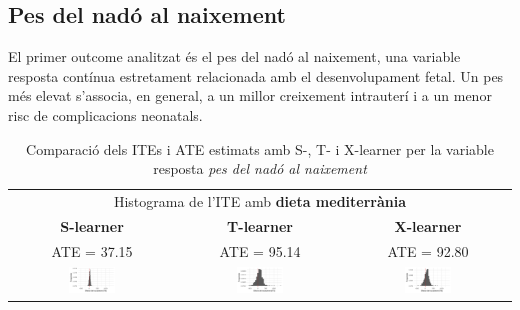 \documentclass[../main.tex]{subfiles}
\begin{document}
    \FloatBarrier
    
    \subsection{Pes del nadó al naixement}\label{subsec:pesNado}
    El primer outcome analitzat és el pes del nadó al naixement, una variable resposta contínua estretament relacionada amb el desenvolupament fetal. Un pes més elevat s’associa, en general, a un millor creixement intrauterí i a un menor risc de complicacions neonatals.
    
    \begin{table}[H]
    \centering
    \begin{tabular}{ccc}
    \multicolumn{3}{c}{Histograma de l'ITE amb \textbf{dieta mediterrània}} \\
    \small \textbf{S-learner} & \small \textbf{T-learner} & \small \textbf{X-learner} \\
    \footnotesize ATE = 37.15 & \footnotesize ATE = 95.14 & \footnotesize ATE = 92.80 \\
    \includegraphics[width=0.3\textwidth]{imgs/histogrames/hist(PesoRN)S_tract2.jpg} &
    \includegraphics[width=0.3\textwidth]{imgs/histogrames/hist(PesoRN)T_tract2.jpg} &
    \includegraphics[width=0.3\textwidth]{imgs/histogrames/hist(PesoRN)X_tract2.jpg} \\
    \end{tabular}
    \caption{\footnotesize Comparació dels ITEs i ATE estimats amb S-, T- i X-learner per la variable resposta \textit{pes del nadó al naixement}}
    \label{tab:histITE_pes2}
    \end{table}
    
\end{document}
